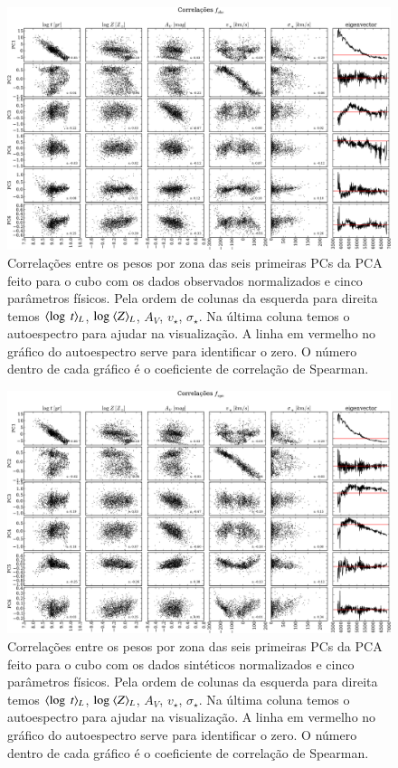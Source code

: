 \begin{figure}
    \includegraphics[width=1.2\textwidth,angle=-90]{figuras/K0277-correl-f_obs_norm-PCvsPhys.pdf}
	\caption[Correlações PCs vs. par\^ametros f\'isicos - $f_{obs}$.]
    {Correlações entre os pesos por zona das seis primeiras PCs da PCA feito para o cubo com os dados observados
    normalizados e cinco parâmetros físicos. Pela ordem de colunas da esquerda para direita temos $\meanL{\log\ t}$,
    $\log\ \meanL{Z}$, $A_V$, $v_{\star}$, $\sigma_{\star}$. Na última coluna temos o autoespectro para ajudar na
    visualização. A linha em vermelho no gráfico do autoespectro serve para identificar o zero. O número dentro de
    cada gráfico é o coeficiente de correlação de Spearman.}
    \label{fig:K0277correfobsnorm}
\end{figure}

\begin{figure}
    \includegraphics[width=1.2\textwidth, angle=-90]{figuras/K0277-correl-f_syn_norm-PCvsPhys.pdf}
	\caption[Correlações PCs vs. par\^ametros f\'isicos - $f_{syn}$.]
    {Correlações entre os pesos por zona das seis primeiras PCs da PCA feito para o cubo com os dados sintéticos
    normalizados e cinco parâmetros físicos. Pela ordem de colunas da esquerda para direita temos $\meanL{\log\ t}$,
    $\log\ \meanL{Z}$, $A_V$, $v_{\star}$, $\sigma_{\star}$. Na última coluna temos o autoespectro para ajudar na visualização.
    A linha em vermelho no gráfico do autoespectro serve para identificar o zero. O número dentro de cada gráfico é o
    coeficiente de correlação de Spearman.}
    \label{fig:K0277correfsynorm}
\end{figure}

